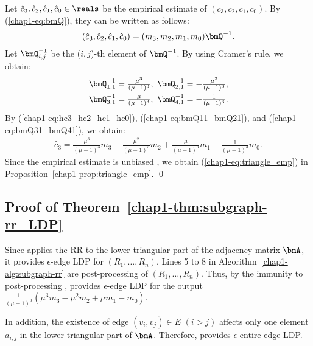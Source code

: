 Let $\hat{c}_3, \hat{c}_2, \hat{c}_1, \hat{c}_0 \in \reals$ be the empirical estimate of $(c_3, c_2, c_1, c_0)$. 
By (\ref{chap1-eq:bmQ}), they can be written as follows:
\begin{align}
(\hat{c}_3, \hat{c}_2, \hat{c}_1, \hat{c}_0) = (m_3, m_2, m_1, m_0) \bmQ^{-1}.
\label{chap1-eq:hc3_hc2_hc1_hc0}
\end{align}
Let $\bmQ_{i,j}^{-1}$ be the ($i,j$)-th element of $\bmQ^{-1}$. 
By using Cramer's rule, we obtain: 
\begin{align}
\bmQ_{1,1}^{-1} &= \textstyle{\frac{\mu^3}{(\mu-1)^3}},~ \bmQ_{2,1}^{-1} =  \textstyle{-\frac{\mu^2}{(\mu-1)^3}}, \label{chap1-eq:bmQ11_bmQ21}\\
\bmQ_{3,1}^{-1} &= \textstyle{\frac{\mu}{(\mu-1)^3}},~ \bmQ_{4,1}^{-1} = \textstyle{-\frac{1}{(\mu-1)^3}}.
\label{chap1-eq:bmQ31_bmQ41}
\end{align}
By (\ref{chap1-eq:hc3_hc2_hc1_hc0}), (\ref{chap1-eq:bmQ11_bmQ21}), and (\ref{chap1-eq:bmQ31_bmQ41}), we obtain:
\begin{align*}
\textstyle{\hat{c}_3 = \frac{\mu^3}{(\mu-1)^3} m_3 - \frac{\mu^2}{(\mu-1)^3} m_2 + \frac{\mu}{(\mu-1)^3} m_1 - \frac{1}{(\mu-1)^3} m_0.}
\end{align*}
Since the empirical estimate is unbiased \cite{Kairouz_ICML16,Wang_USENIX17}, we obtain (\ref{chap1-eq:triangle_emp}) in Proposition~\ref{chap1-prop:triangle_emp}. \qed

\subsection{Proof of Theorem~\ref{chap1-thm:subgraph-rr_LDP}}
Since  applies the RR to the lower triangular part of the adjacency matrix $\bmA$, it provides $\epsilon$-edge LDP for $(R_1, \ldots, R_n)$. 
Lines 5 to 8 in Algorithm~\ref{chap1-alg:subgraph-rr} are post-processing of $(R_1, \ldots, R_n)$. 
Thus, by the immunity to post-processing \cite{DP},  provides $\epsilon$-edge LDP for the output $\frac{1}{(\mu-1)^3}(\mu^3 m_3 -\mu^2 m_2 + \mu m_1 - m_0)$. 

In addition, the existence of edge $(v_i,v_j) \in E$ $(i>j)$ affects only one element $a_{i,j}$ in the lower triangular part of $\bmA$. 
Therefore,  provides $\epsilon$-entire edge LDP.

